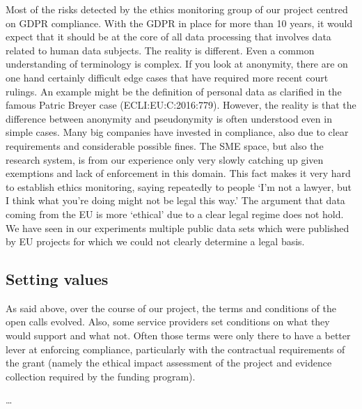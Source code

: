 \documentclass[	DIV=calc,%
							paper=a4,%
							fontsize=11pt,%
							twocolumn, draft]{scrartcl}	 					%
\begin{document}
Most of the risks detected by the ethics monitoring group of our project
centred on GDPR compliance. With the GDPR in place for more than 10
years, it would expect that it should be at the core of all data
processing that involves data related to human data subjects. The
reality is different. Even a common understanding of terminology is
complex. If you look at anonymity, there are on one hand certainly
difficult edge cases that have required more recent court rulings. An
example might be the definition of personal data as clarified in the
famous Patric Breyer case (ECLI:EU:C:2016:779). However, the reality is
that the difference between anonymity and pseudonymity is often
understood even in simple cases. Many big companies have invested in
compliance, also due to clear requirements and considerable possible
fines. The SME space, but also the research system, is from our
experience only very slowly catching up given exemptions and lack of
enforcement in this domain. This fact makes it very hard to establish
ethics monitoring, saying repeatedly to people `I'm not a lawyer, but I
think what you're doing might not be legal this way.' The argument that
data coming from the EU is more `ethical' due to a clear legal regime
does not hold. We have seen in our experiments multiple public data sets
which were published by EU projects for which we could not clearly
determine a legal basis.

\subsection{Setting values}\label{setting-values}

As said above, over the course of our project, the terms and conditions
of the open calls evolved. Also, some service providers set conditions
on what they would support and what not. Often those terms were only
there to have a better lever at enforcing compliance, particularly with
the contractual requirements of the grant (namely the ethical impact
assessment of the project and evidence collection required by the funding
program).

\ldots{}
\end{document}
